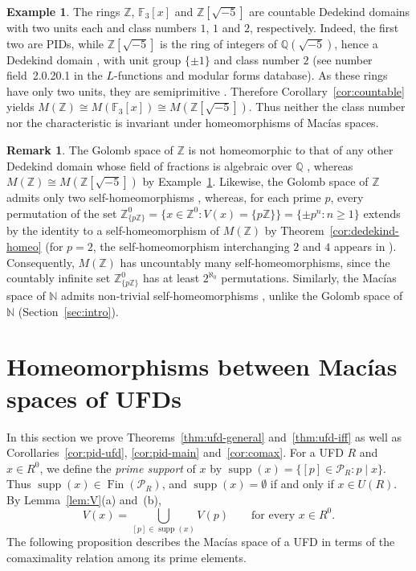 \documentclass[12pt,reqno,a4paper]{amsart}
\newcommand{\Z}{\mathbb{Z}}
\newcommand{\N}{\mathbb{N}}
\newcommand{\Q}{\mathbb{Q}}
\newcommand{\F}{\mathbb{F}}
\newcommand{\Pe}{\mathcal{P}}
\DeclareMathOperator{\Fin}{Fin}
\DeclareMathOperator{\supp}{supp}
\theoremstyle{plain}
\theoremstyle{definition}
\newtheorem{example}[theorem]{Example}
\newtheorem{remark}[theorem]{Remark}
\begin{document}
\begin{example}\label{ex:examples}
The rings $\Z$, $\F_3[x]$ and $\Z[\sqrt{-5}]$ are countable Dedekind domains with two units each and class numbers $1$, $1$ and $2$, respectively. Indeed, the first two are PIDs, while $\Z[\sqrt{-5}]$ is the ring of integers of $\Q(\sqrt{-5})$, hence a Dedekind domain \cite[Theorem~9.5]{AtiyahMacdonald}, with unit group $\{\pm1\}$ and class number $2$ (see number field~2.0.20.1 in the $L$-functions and modular forms database). As these rings have only two units, they are semiprimitive \cite[Proposition~2.2 and Corollary~4.3]{Clark}. Therefore Corollary~\ref{cor:countable} yields $M(\Z)\cong M(\F_3[x])\cong M(\Z[\sqrt{-5}])$. Thus neither the class number nor the characteristic is invariant under homeomorphisms of Mac\'ias spaces.
\end{example}
\begin{remark}\label{rem:golomb}
The Golomb space of $\Z$ is not homeomorphic to that of any other Dedekind domain whose field of fractions is algebraic over $\Q$ \cite[Theorem~7.8]{Spirito}, whereas $M(\Z)\cong M(\Z[\sqrt{-5}])$ by Example~\ref{ex:examples}. Likewise, the Golomb space of $\Z$ admits only two self-homeomorphisms \cite[Theorem~7.7]{Spirito}, whereas, for each prime $p$, every permutation of the set $\Z^0_{\{p\Z\}}={\{x\in\Z^0:V(x)=\{p\Z\}\}}={\{\pm p^n:n\geq1\}}$ extends by the identity to a self-homeomorphism of $M(\Z)$ by Theorem~\ref{cor:dedekind-homeo} (for $p=2$, the self-homeomorphism interchanging $2$ and $4$ appears in \cite[Example~5.4]{MaciasOrtiz}). Consequently, $M(\Z)$ has uncountably many self-homeomorphisms, since the countably infinite set $\Z^0_{\{p\Z\}}$ has at least $2^{\aleph_0}$ permutations. Similarly, the Mac\'ias space of $\N$ admits non-trivial self-homeomorphisms \cite{MaciasSelf}, unlike the Golomb space of $\N$ (Section~\ref{sec:intro}).
\end{remark}
\section{Homeomorphisms between Mac\'ias spaces of UFDs}\label{sec:beyond}
In this section we prove Theorems~\ref{thm:ufd-general} and~\ref{thm:ufd-iff} as well as Corollaries~\ref{cor:pid-ufd}, \ref{cor:pid-main} and~\ref{cor:comax}. For a UFD $R$ and $x\in R^0$, we define the \emph{prime support} of $x$ by $\supp(x)=\{[p]\in\Pe_R:p\mid x\}$. Thus $\supp(x)\in\Fin(\Pe_R)$, and $\supp(x)=\emptyset$ if and only if $x\in U(R)$. By Lemma~\ref{lem:V}(a) and~(b),
\begin{equation}\label{eq:supp}
V(x)=\bigcup_{[p]\in\supp(x)}V(p)\qquad\text{for every }x\in R^0.
\end{equation}
The following proposition describes the Mac\'ias space of a UFD in terms of the comaximality relation among its prime elements.
\end{document}
